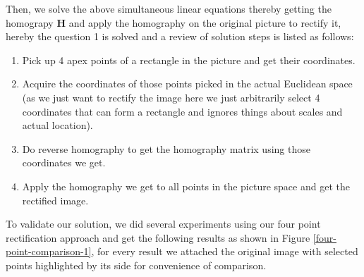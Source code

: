 \documentclass[conference]{IEEEtran}
\newcommand{\mat}[1]{\mathbf{#1}} %
\begin{document}
\noindent Then, we solve the above simultaneous linear equations thereby getting the homograpy $\mat{H}$ and apply the homography on the original picture to rectify it, hereby the question 1 is solved and a review of solution steps is listed as follows:
\begin{enumerate}
	\item Pick up 4 apex points of a rectangle in the picture and get their coordinates.
	\item Acquire the coordinates of those points picked in the actual Euclidean space (as we just want to rectify the image here we just arbitrarily select 4 coordinates that can form a rectangle and ignores things about scales and actual location).
	\item Do reverse homography to get the homography matrix using those coordinates we get.
	\item Apply the homography we get to all points in the picture space and get the rectified image.
\end{enumerate}

To validate our solution, we did several experiments using our four point rectification approach and get the following results as shown in Figure \ref{four-point-comparison-1}, for every result we attached the original image with selected points highlighted by its side for convenience of comparison. 
\begin{figure*}
  \centering
  \caption{Four Point Rectification vs. findHomography in OpenCV}
  \label{four-point-comparison-1} %
\end{figure*}
\end{document}
